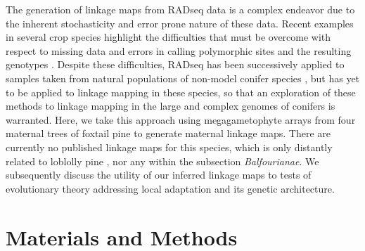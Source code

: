 \documentclass[smallextended]{svjour3}
\begin{document}
The generation of linkage maps from RADseq data is a complex endeavor due to the
inherent stochasticity and error prone nature of these data. Recent examples in
several crop species highlight the difficulties that must be overcome with
respect to missing data and errors in calling polymorphic sites and the
resulting genotypes \citep{Pfender:2011, Ward:2013}. Despite these difficulties,
RADseq has been successively applied to samples taken from natural populations
of non-model conifer species \citep{Parchman:2012}, but has yet to be applied to
linkage mapping in these species, so that an exploration of these methods to
linkage mapping in the large and complex genomes of conifers is warranted. Here,
we take this approach using megagametophyte arrays from four maternal trees of
foxtail pine to generate maternal linkage maps. There are currently no published
linkage maps for this species, which is only distantly related to loblolly pine
\citep{Eckert:2006a}, nor any within the subsection \textit{Balfourianae}.  We
subsequently discuss the utility of our inferred linkage maps to tests of
evolutionary theory addressing local adaptation and its genetic architecture.


\section*{Materials and Methods}\label{ss:mats}
\end{document}
